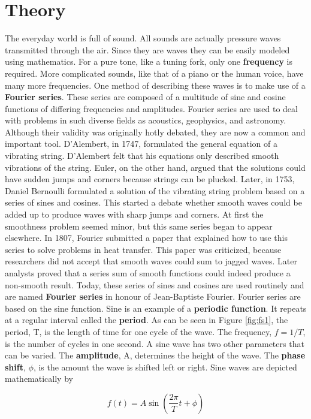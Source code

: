 \section{Theory}
The everyday world is full of sound. All sounds are actually pressure waves transmitted through the air. Since they are waves they can be easily modeled using mathematics. For a pure tone, like a tuning fork, only one {\bf frequency} is required. More complicated sounds, like that of a piano or the human voice, have many more frequencies. One method of describing these waves is to make use of a {\bf Fourier series}. These series are composed of a multitude of sine and cosine functions of differing frequencies and amplitudes. Fourier series are used to deal with problems in such diverse fields as acoustics, geophysics, and astronomy. Although their validity was originally hotly debated, they are now a common and important tool.
	D'Alembert, in 1747, formulated the general equation of a vibrating string. D'Alembert felt that his equations only described smooth vibrations of the string. Euler, on the other hand, argued that the solutions could have sudden jumps and corners because strings can be plucked. Later, in 1753, Daniel Bernoulli formulated a solution of the vibrating string problem based on a series of sines and cosines. This started a debate whether smooth waves could be added up to produce waves with sharp jumps and corners. At first the smoothness problem seemed minor, but this same series began to appear elsewhere. In 1807, Fourier submitted a paper that explained how to use this series to solve problems in heat transfer. This paper was criticized, because researchers did not accept that smooth waves could sum to jagged waves. Later analysts proved that a series sum of smooth functions could indeed produce a non-smooth result. Today, these series of sines and cosines are used routinely and are named {\bf Fourier series} in honour of Jean-Baptiste Fourier.
	Fourier series are based on the sine function. Sine is an example of a {\bf periodic function}. It repeats at a regular interval called the {\bf period}. As can be seen in Figure \ref{fig:fs1}, the period, T, is the length of time for one cycle of the wave. The frequency, $f=1/T$, is the number of cycles in one second. A sine wave has two other parameters that can be varied. The {\bf amplitude}, A, determines the height of the wave. The {\bf phase shift}, $\phi$, is the amount the wave is shifted left or right. Sine waves are depicted mathematically by

\begin{equation}
f(t)=A\sin\left( \frac{2\pi}{T}t+\phi\right)
\label{equ:fs1}
\end{equation}


